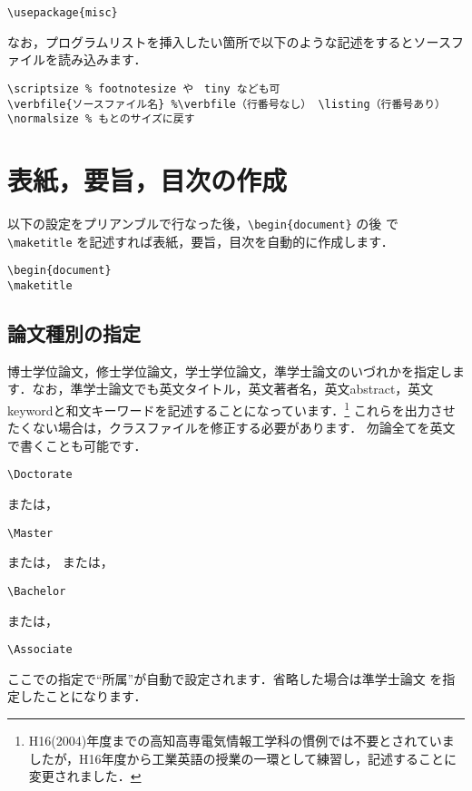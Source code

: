 \documentclass[mingoth]{knct-paper}		%
\begin{document}
\begin{verbatim}
\usepackage{misc}
\end{verbatim}

なお，プログラムリストを挿入したい箇所で以下のような記述をするとソースファイルを読み込みます．

\begin{verbatim}
\scriptsize % footnotesize や　tiny なども可
\verbfile{ソースファイル名} %\verbfile（行番号なし） \listing（行番号あり）
\normalsize % もとのサイズに戻す
\end{verbatim}


 \section{表紙，要旨，目次の作成}
 以下の設定をプリアンブルで行なった後，\verb|\begin{document}| の後
 で \verb|\maketitle| を記述すれば表紙，要旨，目次を自動的に作成します．
 \begin{verbatim}
\begin{document}
\maketitle
\end{verbatim}
 
  \subsection{論文種別の指定}
  博士学位論文，修士学位論文，学士学位論文，準学士論文のいづれかを指定します．なお，準学士論文でも英文タイトル，英文著者名，英文abstract，英文keywordと和文キーワードを記述することになっています．\footnote{H16(2004)年度までの高知高専電気情報工学科の慣例では不要とされていましたが，H16年度から工業英語の授業の一環として練習し，記述することに変更されました．} 
これらを出力させたくない場合は，クラスファイルを修正する必要があります．
  勿論全てを英文で書くことも可能です．
\begin{verbatim}
\Doctorate
\end{verbatim}
  または，
\begin{verbatim}
\Master
\end{verbatim}
  または，
  または，
\begin{verbatim}
\Bachelor
\end{verbatim}
  または，
\begin{verbatim}
\Associate
\end{verbatim}
  ここでの指定で``所属''が自動で設定されます．省略した場合は準学士論文
  を指定したことになります．
\end{document}
